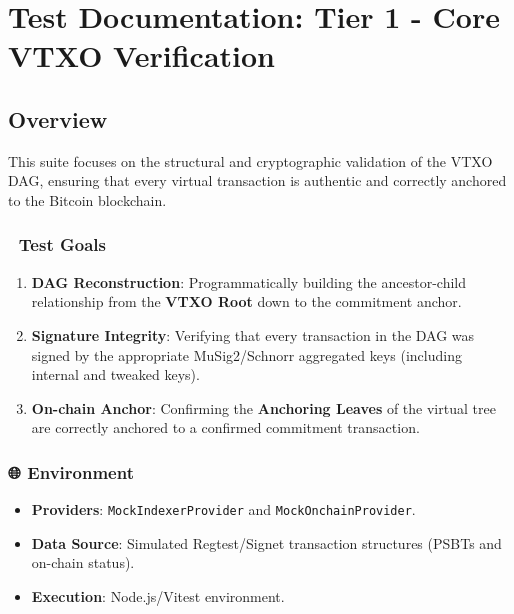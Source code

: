 \documentclass[
]{article}
\author{}
\date{}
\providecommand{\tightlist}{%
  \setlength{\itemsep}{0pt}\setlength{\parskip}{0pt}}
\begin{document}
\hypertarget{test-documentation-tier-1---core-vtxo-verification}{%
\section{Test Documentation: Tier 1 - Core VTXO
Verification}\label{test-documentation-tier-1---core-vtxo-verification}}

\hypertarget{overview}{%
\subsection{Overview}\label{overview}}

This suite focuses on the structural and cryptographic validation of the
VTXO DAG, ensuring that every virtual transaction is authentic and
correctly anchored to the Bitcoin blockchain.

\hypertarget{test-goals}{%
\subsubsection{🎯 Test Goals}\label{test-goals}}

\begin{enumerate}
\def\labelenumi{\arabic{enumi}.}
\tightlist
\item
  \textbf{DAG Reconstruction}: Programmatically building the
  ancestor-child relationship from the \textbf{VTXO Root} down to the
  commitment anchor.
\item
  \textbf{Signature Integrity}: Verifying that every transaction in the
  DAG was signed by the appropriate MuSig2/Schnorr aggregated keys
  (including internal and tweaked keys).
\item
  \textbf{On-chain Anchor}: Confirming the \textbf{Anchoring Leaves} of
  the virtual tree are correctly anchored to a confirmed commitment
  transaction.
\end{enumerate}

\hypertarget{environment}{%
\subsubsection{🌐 Environment}\label{environment}}

\begin{itemize}
\tightlist
\item
  \textbf{Providers}: \texttt{MockIndexerProvider} and
  \texttt{MockOnchainProvider}.
\item
  \textbf{Data Source}: Simulated Regtest/Signet transaction structures
  (PSBTs and on-chain status).
\item
  \textbf{Execution}: Node.js/Vitest environment.
\end{itemize}
\end{document}
